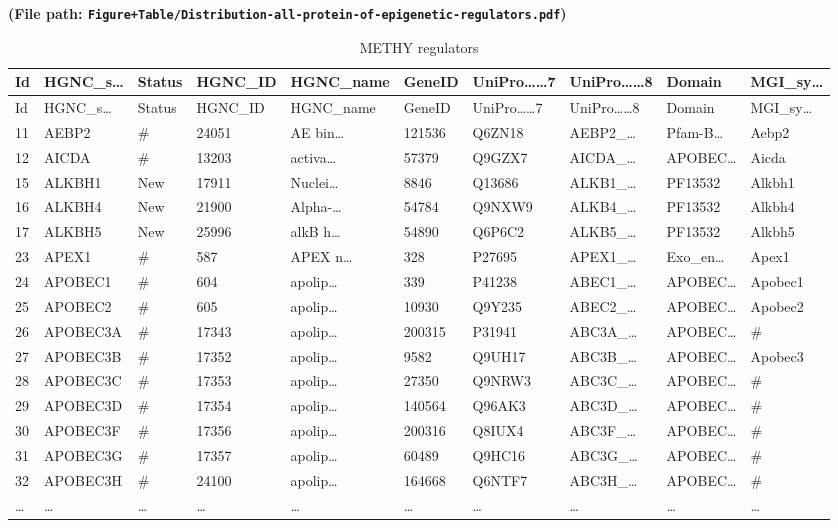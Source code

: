 \documentclass[
]{article}
\begin{document}
\textbf{(File path: \texttt{Figure+Table/Distribution-all-protein-of-epigenetic-regulators.pdf})}

\begin{center}\vspace{1.5cm}\end{center}

\begin{center}\vspace{1.5cm}\end{center}

\begin{longtable}[]{@{}llllllllll@{}}
\caption{\label{tab:METHY-regulators}METHY regulators}\tabularnewline
\toprule
Id & HGNC\_s\ldots{} & Status & HGNC\_ID & HGNC\_name & GeneID & UniPro\ldots\ldots7 & UniPro\ldots\ldots8 & Domain & MGI\_sy\ldots{}\tabularnewline
\midrule
\endfirsthead
\toprule
Id & HGNC\_s\ldots{} & Status & HGNC\_ID & HGNC\_name & GeneID & UniPro\ldots\ldots7 & UniPro\ldots\ldots8 & Domain & MGI\_sy\ldots{}\tabularnewline
\midrule
\endhead
11 & AEBP2 & \# & 24051 & AE bin\ldots{} & 121536 & Q6ZN18 & AEBP2\_\ldots{} & Pfam-B\ldots{} & Aebp2\tabularnewline
12 & AICDA & \# & 13203 & activa\ldots{} & 57379 & Q9GZX7 & AICDA\_\ldots{} & APOBEC\ldots{} & Aicda\tabularnewline
15 & ALKBH1 & New & 17911 & Nuclei\ldots{} & 8846 & Q13686 & ALKB1\_\ldots{} & PF13532 & Alkbh1\tabularnewline
16 & ALKBH4 & New & 21900 & Alpha-\ldots{} & 54784 & Q9NXW9 & ALKB4\_\ldots{} & PF13532 & Alkbh4\tabularnewline
17 & ALKBH5 & New & 25996 & alkB h\ldots{} & 54890 & Q6P6C2 & ALKB5\_\ldots{} & PF13532 & Alkbh5\tabularnewline
23 & APEX1 & \# & 587 & APEX n\ldots{} & 328 & P27695 & APEX1\_\ldots{} & Exo\_en\ldots{} & Apex1\tabularnewline
24 & APOBEC1 & \# & 604 & apolip\ldots{} & 339 & P41238 & ABEC1\_\ldots{} & APOBEC\ldots{} & Apobec1\tabularnewline
25 & APOBEC2 & \# & 605 & apolip\ldots{} & 10930 & Q9Y235 & ABEC2\_\ldots{} & APOBEC\ldots{} & Apobec2\tabularnewline
26 & APOBEC3A & \# & 17343 & apolip\ldots{} & 200315 & P31941 & ABC3A\_\ldots{} & APOBEC\ldots{} & \#\tabularnewline
27 & APOBEC3B & \# & 17352 & apolip\ldots{} & 9582 & Q9UH17 & ABC3B\_\ldots{} & APOBEC\ldots{} & Apobec3\tabularnewline
28 & APOBEC3C & \# & 17353 & apolip\ldots{} & 27350 & Q9NRW3 & ABC3C\_\ldots{} & APOBEC\ldots{} & \#\tabularnewline
29 & APOBEC3D & \# & 17354 & apolip\ldots{} & 140564 & Q96AK3 & ABC3D\_\ldots{} & APOBEC\ldots{} & \#\tabularnewline
30 & APOBEC3F & \# & 17356 & apolip\ldots{} & 200316 & Q8IUX4 & ABC3F\_\ldots{} & APOBEC\ldots{} & \#\tabularnewline
31 & APOBEC3G & \# & 17357 & apolip\ldots{} & 60489 & Q9HC16 & ABC3G\_\ldots{} & APOBEC\ldots{} & \#\tabularnewline
32 & APOBEC3H & \# & 24100 & apolip\ldots{} & 164668 & Q6NTF7 & ABC3H\_\ldots{} & APOBEC\ldots{} & \#\tabularnewline
\ldots{} & \ldots{} & \ldots{} & \ldots{} & \ldots{} & \ldots{} & \ldots{} & \ldots{} & \ldots{} & \ldots{}\tabularnewline
\bottomrule
\end{longtable}
\end{document}

